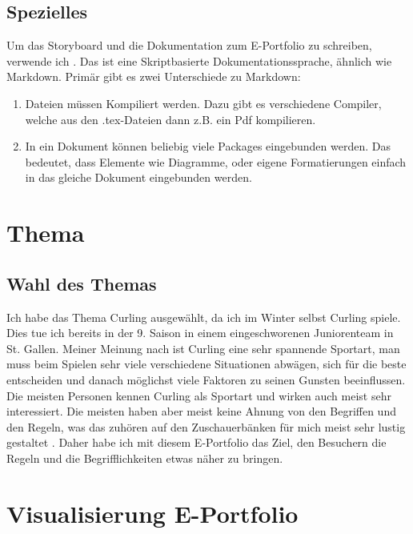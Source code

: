 \documentclass[11pt]{article}
\begin{document}
    \subsection{Spezielles}
    Um das Storyboard und die Dokumentation zum E-Portfolio zu schreiben, verwende ich \latex. Das ist
    eine Skriptbasierte Dokumentationssprache, ähnlich wie Markdown. Primär gibt es zwei Unterschiede zu
    Markdown:
    \begin{enumerate}
        \item \latex Dateien müssen Kompiliert werden. Dazu gibt es verschiedene Compiler, welche aus den
        .tex-Dateien dann z.B. ein Pdf kompilieren.
        \item In ein \latex Dokument können beliebig viele Packages eingebunden werden. Das bedeutet, dass
        Elemente wie Diagramme, oder eigene Formatierungen einfach in das gleiche Dokument eingebunden werden.
    \end{enumerate}

    \pagebreak
    \section{Thema}


    \subsection{Wahl des Themas}

    Ich habe das Thema Curling ausgewählt, da ich im Winter selbst Curling spiele. Dies tue ich bereits in der
    9. Saison in einem eingeschworenen Juniorenteam in St. Gallen.
    Meiner Meinung nach ist Curling eine sehr spannende Sportart, man muss beim Spielen sehr viele verschiedene
    Situationen abwägen, sich für die beste entscheiden und danach möglichst viele Faktoren zu seinen Gunsten
    beeinflussen. \\
    Die meisten Personen kennen Curling als Sportart und wirken auch meist sehr interessiert. Die meisten haben
    aber meist keine Ahnung von den Begriffen und den Regeln, was das zuhören auf den Zuschauerbänken für mich
    meist sehr lustig gestaltet \smiley. Daher habe ich mit diesem E-Portfolio das Ziel, den Besuchern
    die Regeln und die Begrifflichkeiten etwas näher zu bringen.

    \section{Visualisierung E-Portfolio}
\end{document}
